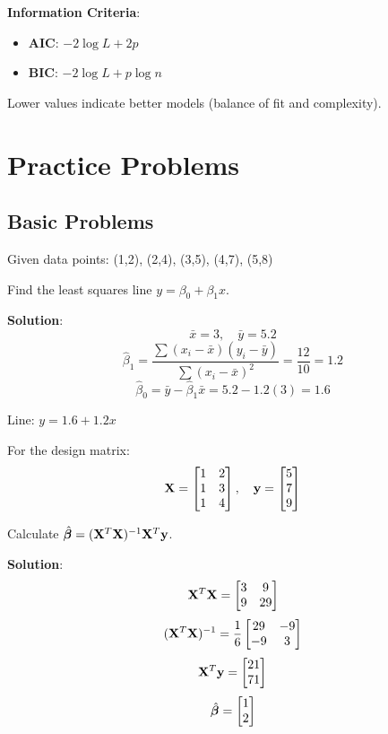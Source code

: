 \documentclass{article}
\newcounter{exercise}
\begin{document}
\textbf{Information Criteria}:
\begin{itemize}
    \item \textbf{AIC}: $-2\log L + 2p$
    \item \textbf{BIC}: $-2\log L + p\log n$
\end{itemize}

Lower values indicate better models (balance of fit and complexity).

\section{Practice Problems}

\subsection{Basic Problems}

\begin{tcolorbox}[colback=gray!5!white,colframe=gray!75!black,title=Problem \stepcounter{exercise}\#\theexercise: Simple Linear Regression]

Given data points: (1,2), (2,4), (3,5), (4,7), (5,8)

Find the least squares line $y = \beta_0 + \beta_1 x$.

\textbf{Solution}:
$$\bar{x} = 3, \quad \bar{y} = 5.2$$
$$\hat{\beta}_1 = \frac{\sum(x_i - \bar{x})(y_i - \bar{y})}{\sum(x_i - \bar{x})^2} = \frac{12}{10} = 1.2$$
$$\hat{\beta}_0 = \bar{y} - \hat{\beta}_1\bar{x} = 5.2 - 1.2(3) = 1.6$$

Line: $y = 1.6 + 1.2x$
\end{tcolorbox}

\begin{tcolorbox}[colback=gray!5!white,colframe=gray!75!black,title=Problem \stepcounter{exercise}\#\theexercise: Matrix Calculation]

For the design matrix:
$$\mathbf{X} = \begin{bmatrix} 1 & 2 \\ 1 & 3 \\ 1 & 4 \end{bmatrix}, \quad \mathbf{y} = \begin{bmatrix} 5 \\ 7 \\ 9 \end{bmatrix}$$

Calculate $\hat{\boldsymbol{\beta}} = (\mathbf{X}^T\mathbf{X})^{-1}\mathbf{X}^T\mathbf{y}$.

\textbf{Solution}:
$$\mathbf{X}^T\mathbf{X} = \begin{bmatrix} 3 & 9 \\ 9 & 29 \end{bmatrix}$$
$$(\mathbf{X}^T\mathbf{X})^{-1} = \frac{1}{6}\begin{bmatrix} 29 & -9 \\ -9 & 3 \end{bmatrix}$$
$$\mathbf{X}^T\mathbf{y} = \begin{bmatrix} 21 \\ 71 \end{bmatrix}$$
$$\hat{\boldsymbol{\beta}} = \begin{bmatrix} 1 \\ 2 \end{bmatrix}$$
\end{tcolorbox}
\end{document}
